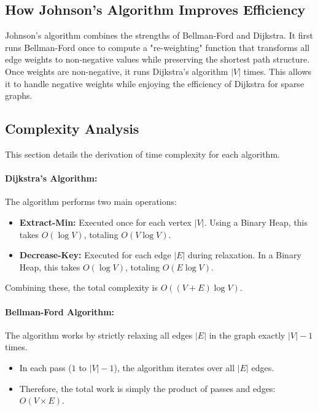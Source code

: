 \documentclass[12pt, a4paper]{article}
\begin{document}
\subsection{How Johnson's Algorithm Improves Efficiency}
Johnson’s algorithm combines the strengths of Bellman-Ford and Dijkstra. It first runs Bellman-Ford once to compute a "re-weighting" function that transforms all edge weights to non-negative values while preserving the shortest path structure. Once weights are non-negative, it runs Dijkstra’s algorithm $|V|$ times. This allows it to handle negative weights while enjoying the efficiency of Dijkstra for sparse graphs.

\subsection{Complexity Analysis}
This section details the derivation of time complexity for each algorithm.

\paragraph{Dijkstra's Algorithm:}
The algorithm performs two main operations:
\begin{itemize}
    \item \textbf{Extract-Min:} Executed once for each vertex $|V|$. Using a Binary Heap, this takes $O(\log V)$, totaling $O(V \log V)$.
    \item \textbf{Decrease-Key:} Executed for each edge $|E|$ during relaxation. In a Binary Heap, this takes $O(\log V)$, totaling $O(E \log V)$.
\end{itemize}
Combining these, the total complexity is $O((V + E) \log V)$.

\paragraph{Bellman-Ford Algorithm:}
The algorithm works by strictly relaxing all edges $|E|$ in the graph exactly $|V| - 1$ times.
\begin{itemize}
    \item In each pass ($1$ to $|V|-1$), the algorithm iterates over all $|E|$ edges.
    \item Therefore, the total work is simply the product of passes and edges: $O(V \times E)$.
\end{itemize}
\end{document}
